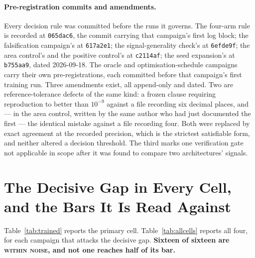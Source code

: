 \documentclass{article}
\begin{document}
\paragraph{Pre-registration commits and amendments.} Every decision rule was committed before the
runs it governs. The four-arm rule is recorded at \texttt{065dac6}, the commit carrying that
campaign's first log block; the falsification campaign's at \texttt{617a2e1}; the signal-generality
check's at \texttt{6efde9f}; the area control's and the positive control's at \texttt{c2114af}; the
seed expansion's at \texttt{b755aa9}, dated 2026-09-18. The oracle and optimisation-schedule
campaigns carry their own pre-registrations, each committed before that campaign's first training
run. Three amendments exist, all append-only and dated. Two are reference-tolerance defects of the
same kind: a frozen clause requiring reproduction to better than $10^{-9}$ against a file recording
six decimal places, and --- in the area control, written by the same author who had just documented
the first --- the identical mistake against a file recording four. Both were replaced by exact
agreement at the recorded precision, which is the strictest satisfiable form, and neither altered a
decision threshold. The third marks one verification gate not applicable in scope after it was found
to compare two architectures' signals.


\section{The Decisive Gap in Every Cell, and the Bars It Is Read Against}
\label{app:diag}

Table~\ref{tab:trained} reports the primary cell. Table~\ref{tab:allcells} reports all four, for
each campaign that attacks the decisive gap. \textbf{Sixteen of sixteen are \textsc{within noise},
and not one reaches half of its bar.}
\end{document}

